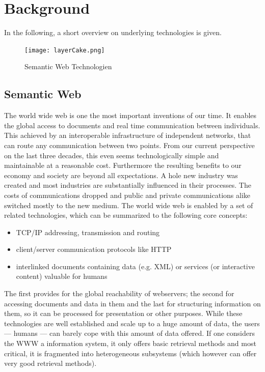\section{Background}
\label{sec:basics}

In the following, a short overview on underlying technologies is given. 
\begin{figure}
  \centering
    \texttt{[image: layerCake.png]}
  \caption{Semantic Web Technologien}
  \label{fig:layercake}
\end{figure}

\subsection{Semantic Web}
The world wide web is one the most important inventions of our time. 
It enables the global access to documents and real time communication between individuals.
This achieved by an interoperable infrastructure of independent networks, that can route any communication between two points.
From our current perspective on the last three decades, this even seems technologically simple and maintainable at a reasonable cost.
Furthermore the resulting benefits to our economy and society are beyond all expectations. A hole new industry was created and most industries are substantially influenced in their processes.
The costs of communications dropped and public and private communications alike switched mostly to the new medium.
The world wide web is enabled by a set of related technologies, which can be summarized to the following core concepts:
\begin{itemize}
\item TCP/IP addressing, transmission and routing
\item client/server communication protocols like HTTP
\item interlinked documents containing data (e.g. XML) or services (or interactive content) valuable for humans
\end{itemize}
The first provides for the global reachability of webservers; the second for accessing documents and data in them and the last for structuring information on them, so it can be processed for presentation or other purposes.
While these technologies are well established and scale up to a huge amount of data, the users --- humans --- can barely cope with this amount of data offered. 
If one considers the WWW a information system, it only offers basic retrieval methods and most critical, it is fragmented into heterogeneous subsystems (which however can offer very good retrieval methods). 
